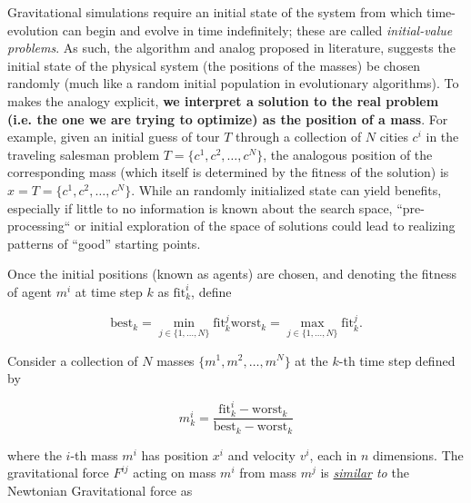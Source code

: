 \documentclass{article}
\begin{document}
        Gravitational simulations require an initial state of the system from which time-evolution can begin and evolve in time indefinitely; these are called \emph{initial-value problems}.  As such, the algorithm and analog proposed in literature\cite{GSA}, suggests the initial state of the physical system (the positions of the masses) be chosen randomly (much like a random initial population in evolutionary algorithms).  To makes the analogy explicit, \textbf{we interpret a solution to the real problem (i.e. the one we are trying to optimize) as the position of a mass}.  For example, given an initial guess of tour $T$ through a collection of $N$ cities $c^i$ in the traveling salesman problem $T = \{c^1, c^2, \ldots, c^N\}$, the analogous position of the corresponding mass (which itself is determined by the fitness of the solution) is $x = T = \{c^1, c^2, \ldots, c^N\}$.  While an randomly initialized state can yield benefits, especially if little to no information is known about the search space, ``pre-processing`` or initial exploration of the space of solutions could lead to realizing patterns of ``good'' starting points.

        Once the initial positions (known as agents) are chosen, and denoting the fitness of agent $m^i$ at time step $k$ as $\mathrm{fit}_k^i$, define

        \begin{subequations}
            \begin{equation}
                \mathrm{best}_k = \min_{j \in \{1, \ldots, N\}} \mathrm{fit}_k^j
            \end{equation}
            \begin{equation}
                \mathrm{worst}_k = \max_{j \in \{1, \ldots, N\}} \mathrm{fit}_k^j.
            \end{equation}
        \end{subequations}

        Consider a collection of $N$ masses $\{m^1, m^2, \ldots, m^N\}$ at the $k$-th time step defined by 
        
        \begin{equation} \label{eq:mass}
            m_k^i = \frac{\mathrm{fit}_k^i - \mathrm{worst}_k}{\mathrm{best}_k- \mathrm{worst}_k}
        \end{equation}
        
        where the $i$-th mass $m^i$ has position $x^i$ and velocity $v^i$, each in $n$ dimensions.  The gravitational force $F^{ij}$ acting on mass $m^i$ from mass $m^j$ is \emph{\underline{similar} to} the Newtonian Gravitational force as 
\end{document}

